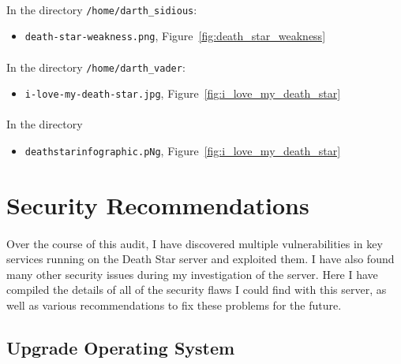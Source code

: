 \documentclass{article}
\begin{document}
\paragraph{}
In the directory \texttt{/home/darth\_sidious}:
\begin{itemize}
	\item \texttt{death-star-weakness.png}, Figure~\ref{fig:death_star_weakness}
\end{itemize}

\paragraph{}
In the directory \texttt{/home/darth\_vader}:
\begin{itemize}
	\item \texttt{i-love-my-death-star.jpg}, Figure~\ref{fig:i_love_my_death_star}
\end{itemize}

\paragraph{}
In the directory 
\begin{itemize}
	\item \texttt{deathstarinfographic.pNg}, Figure~\ref{fig:i_love_my_death_star}
\end{itemize}

\newpage

\section{Security Recommendations}
\label{sec:security_recommendations}
\paragraph{}
Over the course of this audit, I have discovered multiple vulnerabilities in key services running on the Death Star server and exploited them.
I have also found many other security issues during my investigation of the server.
Here I have compiled the details of all of the security flaws I could find with this server, as well as various recommendations to fix these problems for the future.

\subsection{Upgrade Operating System}
\label{subsec:upgrade_os}
\end{document}
